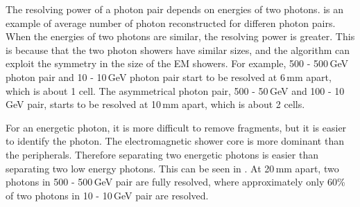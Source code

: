The resolving power of a photon pair depends on energies of two photons.  is an example of average number of photon reconstructed for differen photon pairs. When the energies of two photons are similar, the resolving power is greater. This is because that the two photon showers have similar sizes, and the \peakFinding algorithm can exploit the symmetry in the size of the EM showers. For example, 500 - 500\,GeV photon pair and 10 - 10\,GeV photon pair start to be resolved at 6\,mm apart, which is about 1 \ECAL cell. The asymmetrical photon pair,  500 - 50\,GeV and  100 - 10\,GeV pair, starts to be resolved at 10\,mm apart, which is about 2 \ECAL cells.

For an energetic photon, it is more difficult to remove fragments, but it is easier to identify the photon. The electromagnetic shower core is more dominant than the peripherals. Therefore separating two energetic photons is easier than separating two low energy photons. This can be seen in . At 20\,mm apart, two photons in  500 - 500\,GeV pair are fully resolved, where approximately only 60\% of two photons in 10 - 10\,GeV pair are resolved.

